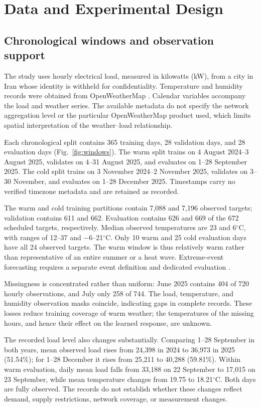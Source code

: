 \documentclass[conference]{IEEEtran}
\newcommand{\degc}{\ensuremath{^{\circ}\mathrm{C}}}
\begin{document}
\section{Data and Experimental Design}
\subsection{Chronological windows and observation support}
The study uses hourly electrical load, measured in kilowatts (kW), from a city in Iran whose identity is withheld for confidentiality. Temperature and humidity records were obtained from OpenWeatherMap \cite{openweather}. Calendar variables accompany the load and weather series. The available metadata do not specify the network aggregation level or the particular OpenWeatherMap product used, which limits spatial interpretation of the weather--load relationship.

Each chronological split contains 365 training days, 28 validation days, and 28 evaluation days (Fig.~\ref{fig:windows}). The warm split trains on 4 August 2024--3 August 2025, validates on 4--31 August 2025, and evaluates on 1--28 September 2025. The cold split trains on 3 November 2024--2 November 2025, validates on 3--30 November, and evaluates on 1--28 December 2025. Timestamps carry no verified timezone metadata and are retained as recorded.

The warm and cold training partitions contain 7,088 and 7,196 observed targets; validation contains 611 and 662. Evaluation contains 626 and 669 of the 672 scheduled targets, respectively. Median observed temperatures are 23 and 6\degc, with ranges of 12--37 and $-6$--21\degc. Only 10 warm and 25 cold evaluation days have all 24 observed targets. The warm window is thus relatively warm rather than representative of an entire summer or a heat wave. Extreme-event forecasting requires a separate event definition and dedicated evaluation \cite{lu2026}.

Missingness is concentrated rather than uniform: June 2025 contains 404 of 720 hourly observations, and July only 258 of 744. The load, temperature, and humidity observation masks coincide, indicating gaps in complete records. These losses reduce training coverage of warm weather; the temperatures of the missing hours, and hence their effect on the learned response, are unknown.

The recorded load level also changes substantially. Comparing 1--28 September in both years, mean observed load rises from 24,398 in 2024 to 36,973 in 2025 (51.54\%); for 1--28 December it rises from 25,211 to 40,288 (59.81\%). Within warm evaluation, daily mean load falls from 33,188 on 22 September to 17,015 on 23 September, while mean temperature changes from 19.75 to 18.21\degc. Both days are fully observed. The records do not establish whether these changes reflect demand, supply restrictions, network coverage, or measurement changes.
\end{document}
